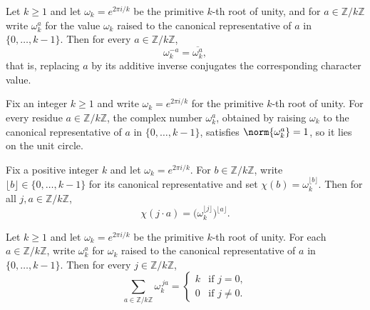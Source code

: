 \begin{lemma}
\label{ZkFourier.toOmega_neg}
\leanok
{}
Let $k \ge 1$ and let $\omega_k = e^{2\pi i/k}$ be the primitive $k$-th root of unity,
and for $a \in \mathbb{Z}/k\mathbb{Z}$ write $\omega_k^{a}$ for the value $\omega_k$
raised to the canonical representative of $a$ in $\{0,\dots,k-1\}$. Then for every $a
\in \mathbb{Z}/k\mathbb{Z}$,
\[
\omega_k^{-a} = \overline{\omega_k^{a}},
\]
that is, replacing $a$ by its additive inverse conjugates the corresponding character
value.
\end{lemma}

\begin{lemma}
\label{ZkFourier.norm_toOmega}
\leanok
{}
Fix an integer $k \ge 1$ and write $\omega_k = e^{2\pi i/k}$ for the primitive $k$-th
root of unity. For every residue $a \in \mathbb{Z}/k\mathbb{Z}$, the complex number
$\omega_k^{a}$, obtained by raising $\omega_k$ to the canonical representative of $a$ in
$\{0,\dots,k-1\}$, satisfies $\norm{\omega_k^{a}} = 1$, so it lies on the unit circle.
\end{lemma}

\begin{lemma}
\label{ZkFourier.toOmega_mul}
\leanok
{}
Fix a positive integer $k$ and let $\omega_k = e^{2\pi i / k}$. For $b \in
\mathbb{Z}/k\mathbb{Z}$, write $\lfloor b\rfloor \in \{0,\ldots,k-1\}$ for its canonical
representative and set $\chi(b) = \omega_k^{\lfloor b\rfloor}$. Then for all $j, a \in
\mathbb{Z}/k\mathbb{Z}$,
\[
  \chi(j \cdot a) = \bigl(\omega_k^{\lfloor j\rfloor}\bigr)^{\lfloor a\rfloor}.
\]
\end{lemma}

\begin{lemma}
\label{ZkFourier.geom_sum_toOmega}
\leanok
{}
Let $k \ge 1$ and let $\omega_k = e^{2\pi i/k}$ be the primitive $k$-th root of unity.
For each $a \in \mathbb{Z}/k\mathbb{Z}$, write $\omega_k^{a}$ for $\omega_k$ raised to
the canonical representative of $a$ in $\{0,\ldots,k-1\}$. Then for every $j \in
\mathbb{Z}/k\mathbb{Z}$,
\[
  \sum_{a \in \mathbb{Z}/k\mathbb{Z}} \omega_k^{\,j a}
  = \begin{cases} k & \text{if } j = 0, \\ 0 & \text{if } j \neq 0. \end{cases}
\]
\end{lemma}

